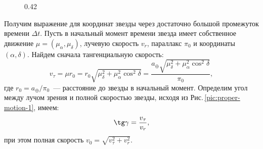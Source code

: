\begin{figure}[h!]
\begin{subcaptionblock}[b]{0.42\tw}
		\caption{}
		\label{pic:proper-motion-2}
	\end{subcaptionblock}
	\caption{}
\end{figure}

Получим выражение для координат звезды через достаточно большой промежуток времени $\Delta t$. Пусть в начальный момент времени звезда имеет собственное движение $\mu = (\mu_\alpha, \mu_\delta)$, лучевую скорость $v_r$, параллакс $\pi_0$ и координаты $(\alpha, \delta)$. Найдем сначала тангенциальную скорость:
\begin{equation*}
	v_\tau =  \mu r_0 = r_0 \sqrt{ \mu_\delta^2 + \mu_\alpha^2 \cos^2 \delta} = \frac{a_\oplus \sqrt{ \mu_\delta^2 + \mu_\alpha^2 \cos^2 \delta}}{\pi_0},
\end{equation*}
где $r_0 = a_\oplus / \pi_0$~--- расстояние до звезды в начальный момент.
Определим угол между лучом зрения и полной скоростью звезды, исходя из Рис.\,\ref{pic:proper-motion-1}, имеем:
\begin{equation*}
	\tg \gamma = \frac{v_\tau}{v_r},
\end{equation*}
при этом полная скорость $v_0 = \sqrt{v_\tau^2 + v_r^2}$.

